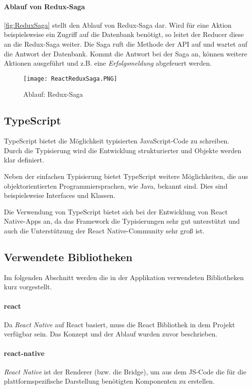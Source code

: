 \newpage
\paragraph{Ablauf von Redux-Saga}
\autoref{fig:ReduxSaga} stellt den Ablauf von Redux-Saga dar. Wird für eine Aktion beispielsweise ein Zugriff auf die Datenbank
benötigt, so leitet der Reducer diese an die Redux-Saga weiter. Die Saga ruft die Methode der API auf und wartet auf
die Antwort der Datenbank. Kommt die Antwort bei der Saga an, können weitere Aktionen ausgeführt und z.B. eine
\textit{Erfolgsmeldung} abgefeuert werden.

\begin{figure}[h]
    \centering
    \texttt{[image: ReactReduxSaga.PNG]}
    \caption{Ablauf: Redux-Saga}
    \label{fig:ReduxSaga}
\end{figure}

\subsection{TypeScript}
TypeScript bietet die Möglichkeit typisierten JavaScript-Code zu schreiben.
Durch die Typisierung wird die Entwicklung strukturierter und Objekte werden
klar definiert.

Neben der einfachen Typisierung bietet TypeScript weitere Möglichkeiten, die aus
objektorientierten Programmiersprachen, wie Java, bekannt sind.
Dies sind beispielsweise Interfaces und Klassen.

Die Verwendung von TypeScript bietet sich bei der Entwicklung von React Native-Apps an,
da das Framework die Typisierungen sehr gut unterstützt und auch die Unterstützung der React Native-Community sehr groß ist. \cite{TypescriptReasons:online}

\subsection{Verwendete Bibliotheken}
Im folgenden Abschnitt werden die in der Applikation verwendeten Bibliotheken kurz vorgestellt.

\paragraph{react}
Da \textit{React Native} auf React basiert, muss die React Bibliothek
in dem Projekt verfügbar sein. Das Konzept und der Ablauf wurden zuvor beschrieben. \cite{React:online}

\paragraph{react-native}
\textit{React Native} ist der Renderer (bzw. die Bridge), um aus dem JS-Code
die für die plattformspezifische Darstellung benötigten Komponenten zu erstellen.
\cite{ReactNative:online}

